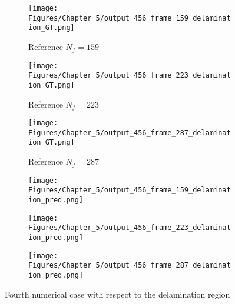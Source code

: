 \begin{figure} [!ht]
	\centering
	\begin{subfigure}[b]{.32\textwidth}
		\centering
		\texttt{[image: Figures/Chapter\_5/output\_456\_frame\_159\_delamination\_GT.png]}
		\caption{Reference $N_f=159$}
		\label{fig:ref_456_damage_159}
	\end{subfigure}
	\begin{subfigure}[b]{.32\textwidth}
		\centering
		\texttt{[image: Figures/Chapter\_5/output\_456\_frame\_223\_delamination\_GT.png]}
		\caption{Reference $N_f=223$}
		\label{fig:ref_456_damage_223}
	\end{subfigure}
	\begin{subfigure}[b]{.32\textwidth}
		\centering
		\texttt{[image: Figures/Chapter\_5/output\_456\_frame\_287\_delamination\_GT.png]}
		\caption{Reference $N_f=287$}
		\label{fig:ref_456_damage_287}	
	\end{subfigure}
	\begin{subfigure}[b]{.32\textwidth}
		\centering
		\texttt{[image: Figures/Chapter\_5/output\_456\_frame\_159\_delamination\_pred.png]}
		\caption{}
		\label{fig:pred_456_damage_159}
	\end{subfigure}
	\begin{subfigure}[b]{.32\textwidth}
		\centering
		\texttt{[image: Figures/Chapter\_5/output\_456\_frame\_223\_delamination\_pred.png]}
		\caption{}
		\label{fig:pred_456_damage_223}
	\end{subfigure}
	\begin{subfigure}[b]{.32\textwidth}
		\centering
		\texttt{[image: Figures/Chapter\_5/output\_456\_frame\_287\_delamination\_pred.png]}
		\caption{}
		\label{fig:pred_456_damage_287}	
	\end{subfigure}
	\caption{Fourth numerical case with respect to the delamination region}
	\label{fig:num_results_CS_damage_area_456}
\end{figure}

